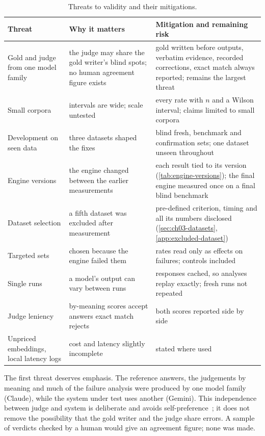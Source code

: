 \begin{table}[htbp]
\centering
\caption{Threats to validity and their mitigations.}
\label{tab:threats}
\scriptsize
\renewcommand{\arraystretch}{1.25}
\begin{tabularx}{\linewidth}{@{}>{\raggedright}p{3.2cm}>{\raggedright}X>{\raggedright\arraybackslash}X@{}}
\toprule
Threat & Why it matters & Mitigation and remaining risk \\
\midrule
Gold and judge from one model family & the judge may share the gold writer's blind spots; no human agreement figure exists & gold written before outputs, verbatim evidence, recorded corrections, exact match always reported; remains the largest threat \\
Small corpora & intervals are wide; scale untested & every rate with $n$ and a Wilson interval; claims limited to small corpora \\
Development on seen data & three datasets shaped the fixes & blind fresh, benchmark and confirmation sets; one dataset unseen throughout \\
Engine versions & the engine changed between the earlier measurements & each result tied to its version (\cref{tab:engine-versions}); the final engine measured once on a final blind benchmark \\
Dataset selection & a fifth dataset was excluded after measurement & pre-defined criterion, timing and all its numbers disclosed (\cref{sec:ch03-datasets}, \cref{app:excluded-dataset}) \\
Targeted sets & chosen because the engine failed them & rates read only as effects on failures; controls included \\
Single runs & a model's output can vary between runs & responses cached, so analyses replay exactly; fresh runs not repeated \\
Judge leniency & by-meaning scores accept answers exact match rejects & both scores reported side by side \\
Unpriced embeddings, local latency logs & cost and latency slightly incomplete & stated where used \\
\bottomrule
\end{tabularx}
\end{table}

The first threat deserves emphasis. The reference answers, the judgements by meaning and much of the failure analysis
were produced by one model family (Claude), while the system under test uses another (Gemini). This independence
between judge and system is deliberate and avoids self-preference~\cite{zheng2023judging}; it does not remove the
possibility that the gold writer and the judge share errors. A sample of verdicts checked by a human would give an
agreement figure; none was made.

